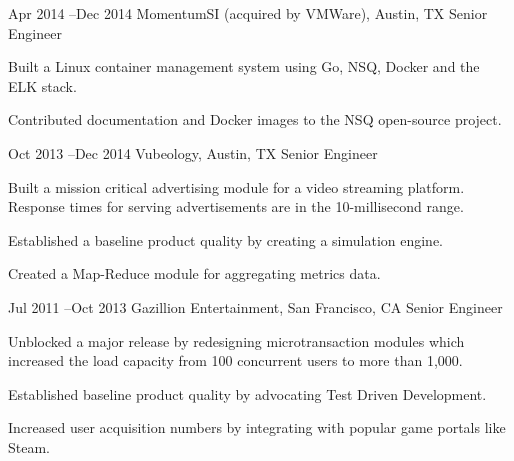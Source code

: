 \documentclass[10pt]{article} %
\begin{document}

\job
{Apr 2014 --}{Dec 2014}
{MomentumSI (acquired by VMWare), Austin, TX}
{}
{Senior Engineer}
{
\begin{itemize-noindent}
\item{Built a Linux container management system using Go, NSQ, Docker and the ELK stack.}
\item{Contributed documentation and Docker images to the NSQ open-source project.}
\end{itemize-noindent}
}


\job
{Oct 2013 --}{Dec 2014}
{Vubeology, Austin, TX}
{}
{Senior Engineer}
{
\begin{itemize-noindent}
\item{Built a mission critical advertising module for a video streaming platform. Response times for serving advertisements are in the 10-millisecond range.} 
\item{Established a baseline product quality by creating a simulation engine.} 
\item{Created a Map-Reduce module for aggregating metrics data.}
\end{itemize-noindent}
}


\job
{Jul 2011 --}{Oct 2013}
{Gazillion Entertainment, San Francisco, CA}
{}
{Senior Engineer}
{
\begin{itemize-noindent}

\item{Unblocked a major release by redesigning microtransaction modules which increased the load capacity from 100 concurrent users to more than 1,000.}
\item{Established baseline product quality by advocating Test Driven Development.}
\item{Increased user acquisition numbers by integrating with popular game portals like Steam.} 
\end{itemize-noindent}
}

\end{document}
